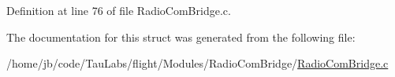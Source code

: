 \-Definition at line 76 of file \-Radio\-Com\-Bridge.\-c.



\-The documentation for this struct was generated from the following file\-:\begin{DoxyCompactItemize}
\item 
/home/jb/code/\-Tau\-Labs/flight/\-Modules/\-Radio\-Com\-Bridge/\hyperlink{_radio_com_bridge_8c}{\-Radio\-Com\-Bridge.\-c}\end{DoxyCompactItemize}
